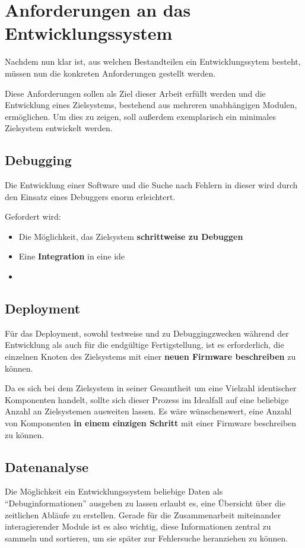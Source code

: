 \section{Anforderungen an das Entwicklungssystem}
Nachdem nun klar ist, aus welchen Bestandteilen ein Entwicklungssytem besteht,
müssen nun die konkreten Anforderungen gestellt werden.

Diese Anforderungen sollen als Ziel dieser Arbeit erfüllt werden und die
Entwicklung eines Zielsystems, bestehend aus mehreren unabhängigen
Modulen, ermöglichen. Um dies zu zeigen, soll außerdem exemplarisch ein
minimales Zielsystem entwickelt werden.

\subsection{Debugging} Die Entwicklung einer Software und die Suche nach Fehlern
in dieser wird durch den Einsatz eines Debuggers enorm erleichtert. 

\begin{minipage}[c]{\textwidth}
Gefordert wird:
\begin{itemize}
  \item Die Möglichkeit, das Zielsystem \textbf{schrittweise zu Debuggen}
  \item Eine \textbf{Integration} in eine \gls{ide}
  \item 
\end{itemize}
\end{minipage}

\subsection{Deployment} Für das Deployment, sowohl testweise und zu
Debuggingzwecken während der Entwicklung als auch für die endgültige
Fertigstellung, ist es erforderlich, die einzelnen Knoten des Zielsystems mit
einer \textbf{neuen Firmware beschreiben} zu können.

Da es sich bei dem Zielsystem in seiner Gesamtheit um eine Vielzahl identischer
Komponenten handelt, sollte sich dieser Prozess im Idealfall auf
eine beliebige Anzahl an Zielsystemen ausweiten lassen. Es wäre wünschenswert,
eine Anzahl von Komponenten \textbf{in einem einzigen Schritt} mit einer
Firmware beschreiben zu können.

\subsection{Datenanalyse}
Die Möglichkeit ein Entwicklungssystem beliebige
Daten als "`Debuginformationen"' ausgeben zu lassen erlaubt es, eine
Übersicht über die zeitlichen Abläufe zu erstellen. Gerade für die
Zusammenarbeit miteinander interagierender Module ist es also wichtig, diese
Informationen zentral zu sammeln und sortieren, um sie später zur
Fehlersuche heranziehen zu können.

